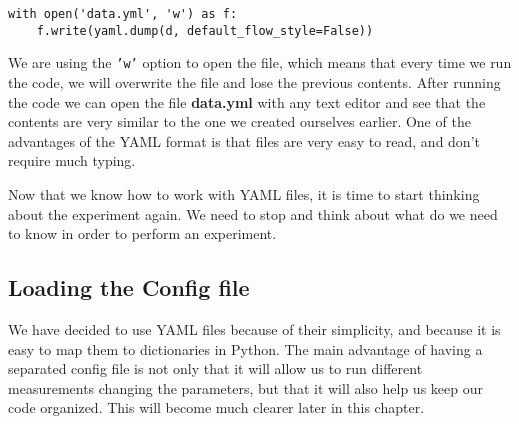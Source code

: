 \begin{verbatim}
with open('data.yml', 'w') as f:
    f.write(yaml.dump(d, default_flow_style=False))
\end{verbatim}

We are using the \texttt{'w'} option to open the file, which means that every time we run the code, we will overwrite the file and lose the previous contents. After running the code we can open the file \textbf{data.yml} with any text editor and see that the contents are very similar to the one we created ourselves earlier. One of the advantages of the YAML format is that files are very easy to read, and don't require much typing. 





Now that we know how to work with YAML files, it is time to start thinking about the experiment again. We need to stop and think about what do we need to know in order to perform an experiment.


\subsection{Loading the Config file}\label{subsection:loading-the-config}
We have decided to use YAML files because of their simplicity, and because it is easy to map them to dictionaries in Python. The main advantage of having a separated config file is not only that it will allow us to run different measurements changing the parameters, but that it will also help us keep our code organized. This will become much clearer later in this chapter. 

